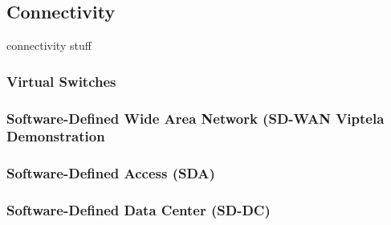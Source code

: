 \subsection{Connectivity}
connectivity stuff

\subsubsection{Virtual Switches}
\subsubsection{Software-Defined Wide Area Network (SD-WAN Viptela Demonstration}
\subsubsection{Software-Defined Access (SDA)}
\subsubsection{Software-Defined Data Center (SD-DC)}

